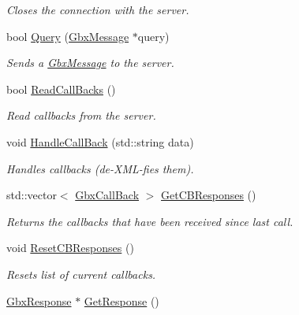 \begin{DoxyCompactItemize}
\begin{DoxyCompactList}\small\item\em Closes the connection with the server. \end{DoxyCompactList}\item 
bool \hyperlink{classGbxRemote_abf869640136958fc4756b3a60275a285}{Query} (\hyperlink{classGbxMessage}{Gbx\-Message} $\ast$query)
\begin{DoxyCompactList}\small\item\em Sends a \hyperlink{classGbxMessage}{Gbx\-Message} to the server. \end{DoxyCompactList}\item 
bool \hyperlink{classGbxRemote_ac595861af2f4d7349ce3841f0758507d}{Read\-Call\-Backs} ()
\begin{DoxyCompactList}\small\item\em Read callbacks from the server. \end{DoxyCompactList}\item 
void \hyperlink{classGbxRemote_a5bd6e1dc2118f7e369e72592b3c9322a}{Handle\-Call\-Back} (std\-::string data)
\begin{DoxyCompactList}\small\item\em Handles callbacks (de-\/\-X\-M\-L-\/fies them). \end{DoxyCompactList}\item 
\hypertarget{classGbxRemote_a1ae6ff7eddcccdeda59af2316d053aae}{std\-::vector$<$ \hyperlink{classGbxCallBack}{Gbx\-Call\-Back} $>$ \hyperlink{classGbxRemote_a1ae6ff7eddcccdeda59af2316d053aae}{Get\-C\-B\-Responses} ()}\label{classGbxRemote_a1ae6ff7eddcccdeda59af2316d053aae}

\begin{DoxyCompactList}\small\item\em Returns the callbacks that have been received since last call. \end{DoxyCompactList}\item 
\hypertarget{classGbxRemote_a81ba62f042948610a3cf720316e22076}{void \hyperlink{classGbxRemote_a81ba62f042948610a3cf720316e22076}{Reset\-C\-B\-Responses} ()}\label{classGbxRemote_a81ba62f042948610a3cf720316e22076}

\begin{DoxyCompactList}\small\item\em Resets list of current callbacks. \end{DoxyCompactList}\item 
\hypertarget{classGbxRemote_adac67444e391ffcc1dfda8f087eaef0b}{\hyperlink{classGbxResponse}{Gbx\-Response} $\ast$ \hyperlink{classGbxRemote_adac67444e391ffcc1dfda8f087eaef0b}{Get\-Response} ()}\label{classGbxRemote_adac67444e391ffcc1dfda8f087eaef0b}


\end{DoxyCompactItemize}
